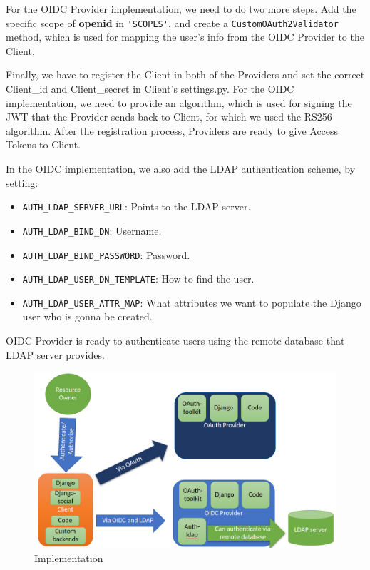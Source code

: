 For the OIDC Provider implementation, we need to do two more steps. Add the specific scope of \textbf{openid} in \verb|'SCOPES'|, and create a \verb|CustomOAuth2Validator| method, which is used for mapping the user's info from the OIDC Provider to the Client. 



Finally, we have to register the Client in both of the Providers and set the correct Client\_id and Client\_secret in Client's settings.py. For the OIDC implementation, we need to provide an algorithm, which is used for signing the JWT that the Provider sends back to Client, for which we used the RS256 algorithm. After the registration process, Providers are ready to give Access Tokens to Client.

In the OIDC implementation, we also add the LDAP authentication scheme, by setting:

\begin{itemize}

	\item \verb|AUTH_LDAP_SERVER_URL|: Points to the LDAP server.

	\item \verb|AUTH_LDAP_BIND_DN|: Username.

	\item \verb|AUTH_LDAP_BIND_PASSWORD|: Password.

	\item \verb|AUTH_LDAP_USER_DN_TEMPLATE|: How to find the user.

	\item \verb|AUTH_LDAP_USER_ATTR_MAP|: What attributes we want to populate the Django user who is gonna be created.

\end{itemize}
OIDC Provider is ready to authenticate users using the remote database that LDAP server provides.


\begin{figure}[htb]
	\centering
	\includegraphics[scale=0.5]{figures/implementation.png}
	\caption{Implementation}
\end{figure}


